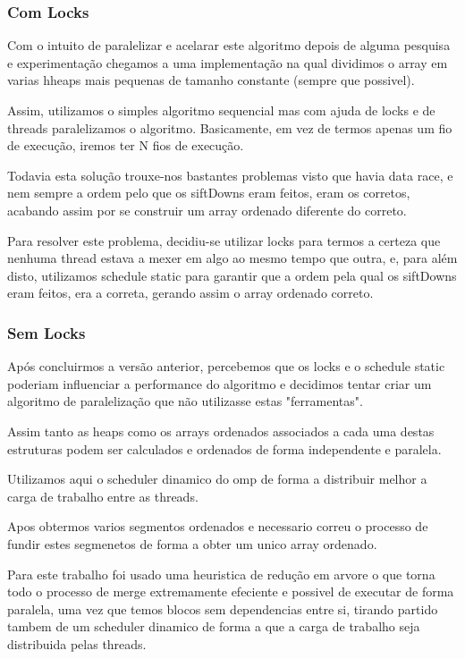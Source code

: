\documentclass{article}
\begin{document}
\subsubsection{Com Locks}
Com o intuito de paralelizar e acelarar este algoritmo depois de alguma pesquisa e experimentação chegamos a uma implementação na qual dividimos o array em varias hheaps mais pequenas de tamanho constante (sempre que possivel). 
\par Assim, utilizamos o simples algoritmo sequencial mas com ajuda de locks e de threads paralelizamos o algoritmo. Basicamente, em vez de termos apenas um fio de execução, iremos ter N fios de execução.
\par Todavia esta solução trouxe-nos bastantes problemas visto que havia data race, e nem sempre a ordem pelo que os siftDowns eram feitos, eram os corretos, acabando assim por se construir um array ordenado diferente do correto.
\par Para resolver este problema, decidiu-se utilizar locks para termos a certeza que nenhuma thread estava a mexer em algo ao mesmo tempo que outra, e, para além disto, utilizamos schedule static para garantir que a ordem pela qual os siftDowns eram feitos, era a correta, gerando assim o array ordenado correto.

\subsubsection{Sem Locks}
\par Após concluirmos a versão anterior, percebemos que os locks e o schedule static poderiam influenciar a performance do algoritmo e decidimos tentar criar um algoritmo de paralelização que não utilizasse estas "ferramentas".
\par Assim tanto as heaps como os arrays ordenados associados a cada uma destas estruturas podem ser calculados e ordenados de forma independente e paralela. 
\par Utilizamos aqui o scheduler dinamico do omp de forma a distribuir melhor a carga de trabalho entre as threads. 
\par Apos obtermos varios segmentos ordenados e necessario correu o processo de fundir estes segmenetos de forma a obter um unico array ordenado. 
\par Para este trabalho foi usado uma heuristica de redução em arvore o que torna todo o processo de merge extremamente efeciente e possivel de executar de forma paralela, uma vez que temos blocos sem dependencias entre si, tirando partido tambem de um scheduler dinamico de forma a que a carga de trabalho seja distribuida pelas threads.
\end{document}
